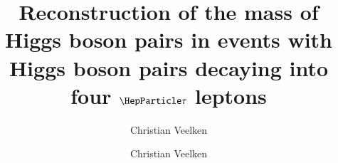 \documentclass[a4paper,english,11pt]{article}
\begin{document}
\ifx\ver\verPAPER
\begin{frontmatter}
\fi

\title{Reconstruction of the mass of Higgs boson pairs in events with Higgs boson pairs
  decaying into four $\Pgt$ leptons}


\ifx\ver\verPreprint
\author[1]{Christian Veelken}
\fi
\ifx\ver\verPAPER
\author[tallinn]{Christian Veelken}
\address[tallinn]{National Institute for Chemical Physics and Biophysics, 10143 Tallinn, Estonia}
\fi

\ifx\ver\verPreprint
\maketitle
\fi


\end{frontmatter}
\end{document}
